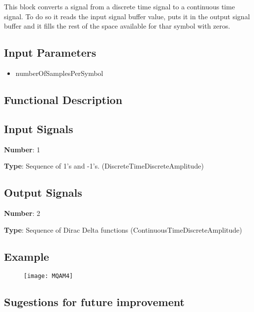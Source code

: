 \documentclass[a4paper]{article}
\begin{document}
This block converts a signal from a discrete time signal to a continuous time signal. To do so it reads the input signal buffer value, puts it in the output signal buffer and it fills the rest of the space available for thar symbol with zeros.

\subsection*{Input Parameters}

\begin{itemize}
	\item numberOfSamplesPerSymbol 
\end{itemize}

\subsection*{Functional Description}

\subsection*{Input Signals}

\textbf{Number}: 1

\textbf{Type}: Sequence of 1's and -1's. (DiscreteTimeDiscreteAmplitude)

\subsection*{Output Signals}

\textbf{Number}: 2

\textbf{Type}: Sequence of Dirac Delta functions (ContinuousTimeDiscreteAmplitude)

\subsection*{Example}

\begin{figure}[h]
	\texttt{[image: MQAM4]}
\end{figure}

\subsection*{Sugestions for future improvement}

\pagebreak

\end{document}
